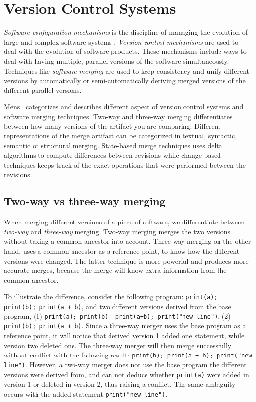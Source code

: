 \documentclass[a4paper,english]{ifimaster}
\begin{document}
\section{Version Control Systems}%
\label{sec:version_control_systems}

\textit{Software configuration mechanisms} is the discipline of managing the evolution of large and complex software systems \cite{cite:software_configuration_management}. \textit{Version control mechanisms} are used to deal with the evolution of software products. These mechanisms include ways to deal with having multiple, parallel versions of the software simultaneously. Techniques like \textit{software merging} are used to keep consistency and unify different versions by automatically or semi-automatically deriving merged versions of the different parallel versions.

Mens~\cite{cite:tom_mens_software_merging_survey} categorizes and describes different aspect of version control systems and software merging techniques. Two-way and three-way merging differentiates between how many versions of the artifact you are comparing. Different representations of the merge artifact can be categorized in textual, syntactic, semantic or structural merging. State-based merge techniques uses delta algorithms to compute differences between revisions while change-based techniques keeps track of the exact operations that were performed between the revisions.

\subsection{Two-way vs three-way merging}%
\label{sub:two_way_vs_three_way_merging}

When merging different versions of a piece of software, we differentiate between \textit{two-way} and \textit{three-way} merging. Two-way merging merges the two versions without taking a common ancestor into account. Three-way merging on the other hand, uses a common ancestor as a reference point, to know how the different versions were changed. The latter technique is more powerful and produces more accurate merges, because the merge will know extra information from the common ancestor.

To illustrate the difference, consider the following program: \texttt{print(a); print(b); print(a + b)}, and two different versions derived from the base program, (1) \texttt{print(a); print(b); print(a+b); print("new line")}, (2) \texttt{print(b); print(a + b)}. Since a three-way merger uses the base program as a reference point, it will notice that derived version 1 added one statement, while version two deleted one. The three-way merger will then merge successfully without conflict with the following result: \texttt{print(b); print(a + b); print("new line")}. However, a two-way merger does not use the base program the different versions were derived from, and can not deduce whether \texttt{print(a)} were added in version 1 or deleted in version 2, thus raising a conflict. The same ambiguity occurs with the added statement \texttt{print("new line")}.
\end{document}
